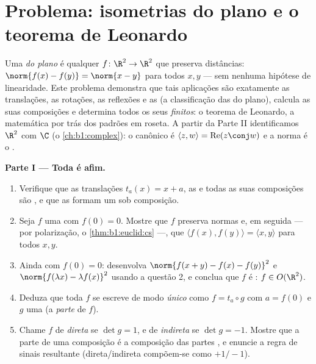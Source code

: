 \section{Problema: isometrias do plano e o teorema de Leonardo}

\begin{problem}\label{pb:b1:euclid:1}
Uma \emph{ do plano} é qualquer  $f \colon \R^2 \to
\R^2$ que
preserva distâncias: $\norm{f(x) - f(y)} = \norm{x - y}$ para todos $x, y$ --- sem nenhuma
hipótese de linearidade. Este problema demonstra que tais aplicações
são exatamente as translações, as rotações, as reflexões e as
 (a classificação das  do plano),
calcula as suas composições e determina todos os seus 
\emph{finitos}: o teorema de Leonardo, a matemática por trás dos
padrões em roseta. A partir da Parte II identificamos $\R^2$ com
$\C$ (o \cref{ch:b1:complex}): o  canônico é $\langle z, w\rangle = \operatorname{Re}(z\conj w)$ e a norma é o
.

\medskip
\noindent\textbf{Parte I --- Toda  é afim.}
\begin{enumerate}
  \item Verifique que as translações $t_a(x) = x + a$, as  
        e todas as suas composições são , e que as
         formam um  sob composição.
  \item Seja $f$ uma  com $f(0) = 0$. Mostre que $f$ preserva
        normas e, em seguida --- por polarização, o \cref{thm:b1:euclid:cs} ---, que
        $\langle f(x),
        f(y)\rangle = \langle x, y\rangle$ para todos $x, y$.
  \item Ainda com $f(0) = 0$: desenvolva $\norm{f(x + y) - f(x) -
        f(y)}^2$ e $\norm{f(\lambda x) - \lambda f(x)}^2$ usando a questão
        2, e conclua que $f$ é \emph{}: $f \in O(\R^2)$.
  \item Deduza que toda  $f$ se escreve de modo
        \emph{único} como $f = t_a \circ g$ com $a = f(0)$ e $g$ uma 
         (a \emph{parte } de $f$).
  \item Chame $f$ de \emph{direta} se $\det g = 1$, e de \emph{indireta}
        se $\det g = -1$. Mostre que a parte  de uma composição é a
        composição das partes , e enuncie a regra de sinais
        resultante (direta/indireta compõem-se como $+1/-1$).
\end{enumerate}


\end{problem}
